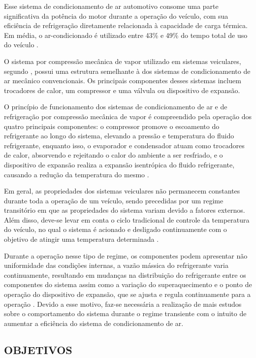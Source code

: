 Esse sistema de condicionamento de ar automotivo consome uma parte significativa da potência do motor durante a operação do veículo, com sua eficiência de refrigeração diretamente relacionada à capacidade de carga térmica. Em média, o ar-condicionado é utilizado entre 43\% e 49\% do tempo total de uso do veículo \cite{farrington2000}.

O sistema por compressão mecânica de vapor utilizado em sistemas veiculares, segundo  \textcite{dasilva2016}, possui uma estrutura semelhante à dos sistemas de condicionamento de ar mecânico convencionais. Os principais componentes desses sistemas incluem trocadores de calor, um compressor e uma válvula ou dispositivo de expansão.

O princípio de funcionamento dos sistemas de condicionamento de ar e de refrigeração por compressão mecânica de vapor é compreendido pela operação dos quatro principais componentes: o compressor promove o escoamento do refrigerante ao longo do sistema, elevando a pressão e temperatura do fluido refrigerante, enquanto isso, o evaporador e condensador atuam como trocadores de calor, absorvendo e rejeitando o calor do ambiente a ser resfriado, e o dispositivo de expansão realiza a expansão isentrópica do fluido refrigerante, causando a redução da temperatura do mesmo \cite{junior2023}.

Em geral, as propriedades dos sistemas veiculares não permanecem constantes durante toda a operação de um veículo, sendo precedidas por um regime transitório em que as propriedades do sistema variam devido a fatores externos. Além disso, deve-se levar em conta o ciclo tradicional de controle da temperatura do veículo, no qual o sistema é acionado e desligado continuamente com o objetivo de atingir uma temperatura determinada \cite{juliani2017}.

Durante a operação nesse tipo de regime, os componentes podem apresentar não uniformidade das condições internas, a vazão mássica do refrigerante varia continuamente, resultando em mudanças na distribuição do refrigerante entre os componentes do sistema assim como a variação do superaquecimento e o ponto de operação do dispositivo de expansão, que se ajusta e regula continuamente para a operação \cite{rangel2007}. Devido a esse motivo, faz-se necessária a realização de mais estudos sobre o comportamento do sistema durante o regime transiente com o intuito de aumentar a eficiência do sistema de condicionamento de ar.

\subsection{OBJETIVOS}

